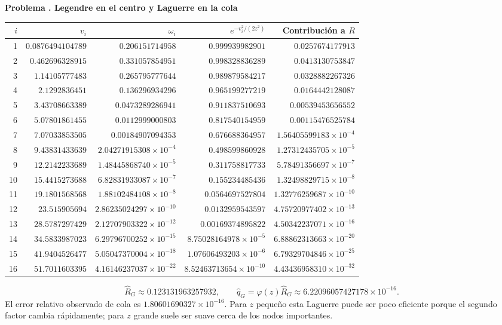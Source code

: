 \documentclass[11pt,a4paper]{article}
\theoremstyle{definition}
\newcounter{problema}
\newenvironment{resuelto}[1]{\refstepcounter{problema}\par\medskip\Needspace{6\baselineskip}\textbf{Problema \theproblema. #1}\par}{\par\medskip}
\begin{document}
\begin{resuelto}{Legendre en el centro y Laguerre en la cola}
\begin{center}\small\begin{tabular}{rrrrr}
\toprule
$i$&$v_i$&$\omega_i$&$e^{-v_i^2/(2z^2)}$&Contribución a $R$\\
\midrule
1&$0.0876494104789$&$0.206151714958$&$0.999939982901$&$0.0257674177913$\\
2&$0.462696328915$&$0.331057854951$&$0.998328836289$&$0.0413130753847$\\
3&$1.14105777483$&$0.265795777644$&$0.989879584217$&$0.0328882267326$\\
4&$2.1292836451$&$0.136296934296$&$0.965199277219$&$0.0164442128087$\\
5&$3.43708663389$&$0.0473289286941$&$0.911837510693$&$0.00539453656552$\\
6&$5.07801861455$&$0.0112999000803$&$0.817540154959$&$0.00115476525784$\\
7&$7.07033853505$&$0.00184907094353$&$0.676688364957$&$1.56405599183\times10^{-4}$\\
8&$9.43831433639$&$2.04271915308\times10^{-4}$&$0.498599860928$&$1.27312435705\times10^{-5}$\\
9&$12.2142233689$&$1.48445868740\times10^{-5}$&$0.311758817733$&$5.78491356697\times10^{-7}$\\
10&$15.4415273688$&$6.82831933087\times10^{-7}$&$0.155234485436$&$1.32498829715\times10^{-8}$\\
11&$19.1801568568$&$1.88102484108\times10^{-8}$&$0.0564697527804$&$1.32776259687\times10^{-10}$\\
12&$23.515905694$&$2.86235024297\times10^{-10}$&$0.0132959543597$&$4.75720977402\times10^{-13}$\\
13&$28.5787297429$&$2.12707903322\times10^{-12}$&$0.00169374895822$&$4.50342237071\times10^{-16}$\\
14&$34.5833987023$&$6.29796700252\times10^{-15}$&$8.75028164978\times10^{-5}$&$6.88862313663\times10^{-20}$\\
15&$41.9404526477$&$5.05047370004\times10^{-18}$&$1.07606493203\times10^{-6}$&$6.79329704846\times10^{-25}$\\
16&$51.7011603395$&$4.16146237037\times10^{-22}$&$8.52463713654\times10^{-10}$&$4.43436958310\times10^{-32}$\\
\bottomrule\end{tabular}\end{center}
\[
\widehat R_G\approx0.123131963257932,\qquad
\widehat q_G=\varphi(z)\widehat R_G\approx6.22096057427178\times10^{-16}.
\]
El error relativo observado de cola es $1.80601690327\times10^{-16}$. Para $z$ pequeño esta Laguerre puede ser poco eficiente porque el segundo factor cambia rápidamente; para $z$ grande suele ser suave cerca de los nodos importantes.

\end{resuelto}
\end{document}
